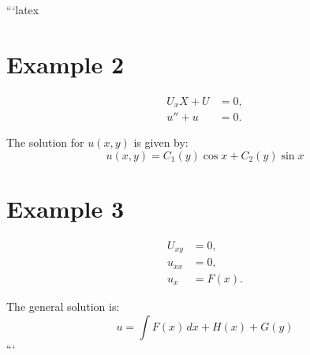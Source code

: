 ```latex
\section*{Example 2}

\begin{align}
    U_x X + U &= 0, \\
    u'' + u &= 0.
\end{align}

The solution for \( u(x, y) \) is given by:
\[
u(x, y) = C_1(y) \cos x + C_2(y) \sin x
\]

\section*{Example 3}

\begin{align}
    U_{xy} &= 0, \\
    u_{xx} &= 0, \\
    u_x &= F(x).
\end{align}

The general solution is:
\[
u = \int F(x) \, dx + H(x) + G(y)
\]
```
